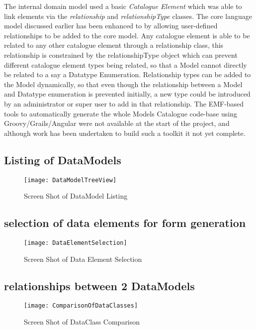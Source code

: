 The internal domain model used a basic \emph{Catalogue Element} which was able to link elements via the \emph{relationship} and \emph{relationshipType} classes. The core language model discussed earlier has been enhanced to by allowing user-defined relationships to be added to the core model. Any catalogue element is able to be related to any other catalogue element through a relationship class, this relationship is constrained by the relationshipType object which can prevent different catalogue element types being related, so that a Model cannot directly be related to a say a Datatype Enumeration. Relationship types can be added to the Model dynamically, so that even though the relationship between a Model and Datatype enumeration is prevented initially, a new type could be introduced by an administrator or super user to add in that relationship. The EMF-based tools to automatically generate the whole Models Catalogue code-base using Groovy/Grails/Angular were not available at the start of the project, and although work has been undertaken to build such a toolkit it not yet complete.  


\subsection{Listing of DataModels}

\begin{figure}[here]
	\texttt{[image: DataModelTreeView]}
	\caption{Screen Shot of DataModel Listing} 
	\label{fig:treeviewOfDataModel}	
\end{figure}

\subsection{selection of data elements for form generation}

\begin{figure}[here]
	\texttt{[image: DataElementSelection]}
	\caption{Screen Shot of Data Element Selection} 
	\label{fig:treeviewOfDataModel}	
\end{figure}


\subsection{relationships between 2 DataModels}

\begin{figure}[here]
	\texttt{[image: ComparisonOfDataClasses]}
	\caption{Screen Shot of DataClass Comparison} 
	\label{fig:dataClassComparison}	
\end{figure}







